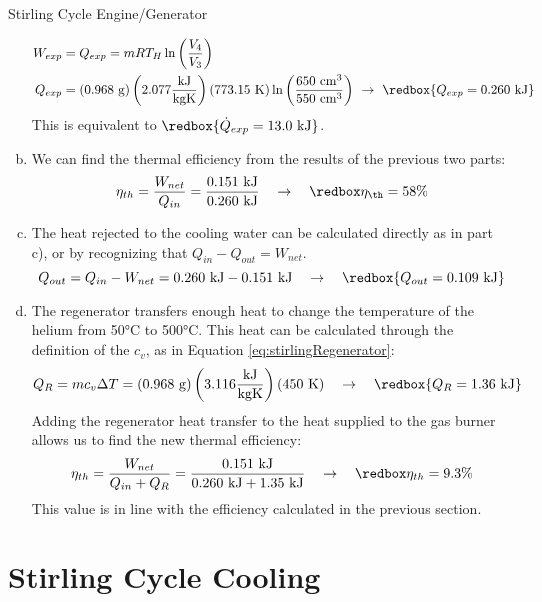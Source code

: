 \begin{example}{Stirling Cycle Engine/Generator}
\begin{enumerate}[a)]
    \begin{align*}
      W_{exp} &= Q_{exp} = m R T_H \ln{\left(\frac{V_4}{V_3}\right)} \\
      Q_{exp} &= ({0.968\ \rm g}) \left(2.077\frac{\rm kJ}{\rm kg K}\right) (773.15\ {\rm K}) \ln{\left(\frac{650\ \rm cm^3}{550\ \rm cm^3}\right)} \ \rightarrow\ \redbox{Q_{exp} = 0.260\ \rm kJ}
    \end{align*}
    This is equivalent to $\redbox{\dot{Q}_{exp} = 13.0\rm\ kJ}$.
  \item We can find the thermal efficiency from the results of the previous two parts:
    \begin{equation*}
      \eta_{th} = \frac{W_{net}}{Q_{in}} = \frac{0.151\rm\ kJ}{0.260\rm\ kJ} \quad\rightarrow\quad \redbox{\eta_{\th} = 58\%}
    \end{equation*}
  \item The heat rejected to the cooling water can be calculated directly as in part c), or by recognizing that $Q_{in} - Q_{out} = W_{net}$.
    \begin{equation*}
      Q_{out} = Q_{in} - W_{net} = 0.260{\rm\ kJ} - 0.151{\rm\ kJ} \quad\rightarrow\quad \redbox{Q_{out} = 0.109{\rm\ kJ}}
    \end{equation*}
  \item The regenerator transfers enough heat to change the temperature of the helium from 50°C to 500°C.  This heat can be calculated through the definition of the $c_v$, as in Equation \ref{eq:stirlingRegenerator}:
    \begin{equation*}
      Q_R = m c_v \Delta T = ({0.968\ \rm g})\left(3.116\frac{\rm kJ}{\rm kg K}\right) (450\ {\rm K}) \quad\rightarrow\quad \redbox{Q_R = 1.36\rm\ kJ}
    \end{equation*}
    Adding the regenerator heat transfer to the heat supplied to the gas burner allows us to find the new thermal efficiency:
    \begin{equation*}
      \eta_{th} = \frac{W_{net}}{Q_{in}+Q_R} = \frac{0.151\rm\ kJ}{0.260\rm\ kJ + 1.35\rm\ kJ} \quad\rightarrow\quad \redbox{\eta_{th} = 9.3\%}
    \end{equation*}
    This value is in line with the efficiency calculated in the previous section.
  \end{enumerate}
  
\end{example}

\section{Stirling Cycle Cooling} \label{sec:ch3_StirlingCooling}

